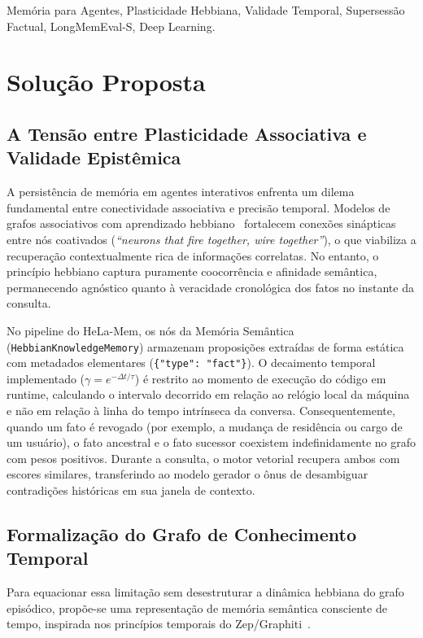 \documentclass[10pt,conference,twocolumn]{IEEEtran}
\begin{document}
\begin{IEEEkeywords}
Memória para Agentes, Plasticidade Hebbiana, Validade Temporal, Supersessão Factual, LongMemEval-S, Deep Learning.
\end{IEEEkeywords}

\section{Solução Proposta}

\subsection{A Tensão entre Plasticidade Associativa e Validade Epistêmica}
A persistência de memória em agentes interativos enfrenta um dilema fundamental entre conectividade associativa e precisão temporal. Modelos de grafos associativos com aprendizado hebbiano~\cite{helamem2026} fortalecem conexões sinápticas entre nós coativados (\textit{``neurons that fire together, wire together''}), o que viabiliza a recuperação contextualmente rica de informações correlatas. No entanto, o princípio hebbiano captura puramente coocorrência e afinidade semântica, permanecendo agnóstico quanto à veracidade cronológica dos fatos no instante da consulta.

No pipeline do HeLa-Mem, os nós da Memória Semântica (\texttt{HebbianKnowledgeMemory}) armazenam proposições extraídas de forma estática com metadados elementares (\texttt{\{"type": "fact"\}}). O decaimento temporal implementado ($\gamma = e^{-\Delta t / \tau}$) é restrito ao momento de execução do código em runtime, calculando o intervalo decorrido em relação ao relógio local da máquina e não em relação à linha do tempo intrínseca da conversa. Consequentemente, quando um fato é revogado (por exemplo, a mudança de residência ou cargo de um usuário), o fato ancestral e o fato sucessor coexistem indefinidamente no grafo com pesos positivos. Durante a consulta, o motor vetorial recupera ambos com escores similares, transferindo ao modelo gerador o ônus de desambiguar contradições históricas em sua janela de contexto.

\subsection{Formalização do Grafo de Conhecimento Temporal}
Para equacionar essa limitação sem desestruturar a dinâmica hebbiana do grafo episódico, propõe-se uma representação de memória semântica consciente de tempo, inspirada nos princípios temporais do Zep/Graphiti~\cite{zep2025}. 
\end{document}

